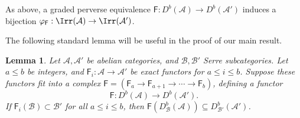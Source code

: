 \documentclass[11pt,reqno]{amsart}
\numberwithin{equation}{section}
\newtheorem{Lemma}[equation]{Lemma}
\newtheorem{Corollary}[equation]{Corollary}
\theoremstyle{definition}
\theoremstyle{named}
\newcommand{\cA}{\mathcal{A}}
\newcommand{\cB}{\mathcal{B}}
\newcommand{\sF}{\mathsf{F}}
\newcommand{\ZZ}{\mathbb{Z}}
\newcommand{\oded}[1]{\textcolor{red}{$[\star$ Oded: #1 $\star]$}}
\begin{document}

 As above, a graded perverse equivalence $\sF:D^b(\mathcal{A}) \to D^b(\mathcal{A}')$ induces a bijection $\varphi_\sF:\Irr(\cA)\to\Irr(\cA')$.  
 
The following standard lemma will be useful in the proof of our main result.  

\begin{Lemma}\label{lem:trianginv}
Let $\cA,\cA'$ be abelian categories, and $\cB,\cB'$ Serre subcategories.  Let $a\leq b$ be integers, and $\sF_i:\cA \to \cA'$ be exact functors for $a \leq i \leq b$.  Suppose these functors  fit into a  complex $\sF=(\sF_a \to \sF_{a+1} \to \cdots \to \sF_{b} )$, defining a functor 
$$
\sF:D^b(\cA) \to D^b(\cA').
$$
If $\sF_i(\cB)\subset \cB'$ for all $a \leq i \leq b$, then $\sF(D_\cB^b(\cA))\subseteq D_{\cB'}^b(\cA')$.
\end{Lemma} 

 
 
 
%  
\end{document}
